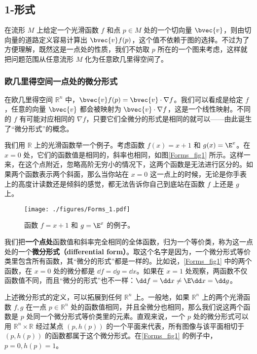 

\subsection{1-形式}

在流形 $M$ 上给定一个光滑函数 $f$ 和点 $p\in M$ 处的一个切向量 $\bvec{v}$，则由切向量的道路定义容易计算出 $\bvec{v}f(p)$，这个值不依赖于图的选择。不过为了方便理解，既然这是一点处的性质，我们不妨取 $p$ 所在的一个图来考虑，这样就把问题范围从任意流形 $M$ 化为任意欧几里得空间了。

\subsubsection{欧几里得空间一点处的微分形式}



在欧几里得空间 $\mathbb{R}^n$ 中，$\bvec{v}f(p)=\bvec{v}\cdot\nabla f$。我们可以看成是给定 $f$，任意的向量 $\bvec{v}$ 都会被映射为 $\bvec{v}\cdot\nabla f$，这是一个线性映射。不同的 $f$ 有可能对应相同的 $\nabla f$，只要它们全微分的形式是相同的就可以——由此诞生了“微分形式”的概念。

我们用 $\mathbb{R}$ 上的光滑函数举一个例子。考虑函数 $f(x)=x+1$ 和 $g(x)=\E^x$。在 $x=0$ 处，它们的函数值是相同的，斜率也相同，如图\autoref{Forms_fig1} 所示。这样一来，在这个点附近，忽略高阶无穷小的情况下，这两个函数是无法进行区分的。如果两个函数表示两个斜面，那么当你站在 $x=0$ 这一点上的时候，无论是你手表上的高度计读数还是倾斜的感觉，都无法告诉你自己到底站在函数 $f$ 上还是 $g$ 上。

\begin{figure}[ht]
\centering
\texttt{[image: ./figures/Forms\_1.pdf]}
\caption{函数 $f=x+1$ 和 $g=\E^x$ 的例子。} \label{Forms_fig1}
\end{figure}

我们把\textbf{一个点处}函数值和斜率完全相同的全体函数，归为一个等价类，称为这一点处的一个\textbf{微分形式（differential form）}。取这个名字是因为，一个微分形式等价类里包含所有函数，其“微分的形式”都是一样的。比如说，\autoref{Forms_fig1} 中的两个函数，在 $x=0$ 处的微分都是 $\dd f=\dd g=\dd x$。如果在 $x=1$ 处观察，两函数不仅函数值不同，而且“微分的形式”也不一样：$\dd f=\dd x\not=\E\dd x=\dd g$。

上述微分形式的定义，可以拓展到任何 $\mathbb{R}^n$ 上。一般地，如果 $\mathbb{R}^n$ 上的两个光滑函数 $f, g$ 在一点 $p\in\mathbb{R}^n$ 处的函数值相同，并且全微分也相同，那么我们说这两个函数是 $p$ 处同一个微分形式等价类里的元素。直观来说，一个 $p$ 处的微分形式可以用 $\mathbb{R}^n\times\mathbb{R}$ 经过某点 $(p, h(p))$ 的一个平面来代表，所有图像与该平面相切于 $(p, h(p))$ 的函数都属于这个微分形式。在\autoref{Forms_fig1} 的例子中，$p=0, h(p)=1$。

